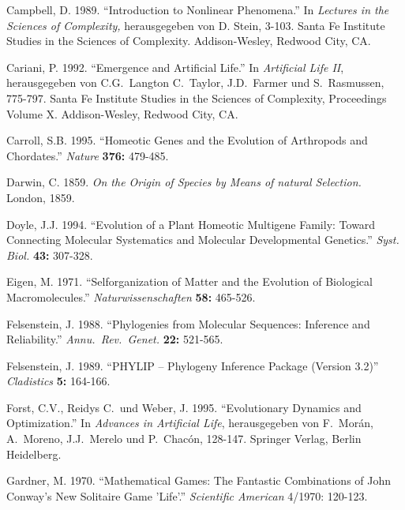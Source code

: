 \begin{thebibliography}{99}
Campbell, D. 1989. "`Introduction to Nonlinear Phenomena."' In \textsl{Lectures in the Sciences of Complexity,}
herausgegeben von D. Stein, 3-103. Santa Fe
Institute Studies in the Sciences of Complexity. Addison-Wesley, Redwood City, CA.

Cariani, P. 1992. "`Emergence and Artificial Life."'
In \textsl{Artificial Life II}, herausgegeben von C.G.\ Langton 
C.\ Taylor, J.D.\ Farmer und S.\ Rasmussen, 775-797. Santa Fe
Institute Studies in the Sciences of Complexity, Proceedings Volume X.
Addison-Wesley, Redwood City, CA.

Carroll, S.B. 1995. "`Homeotic Genes and the Evolution of Arthropods and Chordates."'
\textsl{Nature} \textbf{376:} 479-485.


Darwin, C. 1859. \textsl{On the Origin of Species by Means of natural Selection.} London, 1859.

Doyle, J.J. 1994. "`Evolution of a Plant Homeotic Multigene Family: Toward Connecting Molecular Systematics
and Molecular Developmental Genetics."' \textsl{Syst. Biol.} \textbf{43:} 307-328.

Eigen, M. 1971. "`Selforganization of Matter and the Evolution of Biological
Macromolecules."' \textsl{Naturwissenschaften} \textbf{58:} 465-526.

Felsenstein, J. 1988. "`Phylogenies from Molecular Sequences: Inference and Reliability."'
\textsl{Annu.\ Rev.\ Genet.} \textbf{22:} 521-565.

Felsenstein, J. 1989. "`PHYLIP -- Phylogeny Inference Package (Version 3.2)"'
\textsl{Cladistics} \textbf{5:} 164-166.

Forst, C.V., Reidys C.\ und Weber, J. 1995. "`Evolutionary Dynamics and Optimization."'
In \textsl{Advances in Artificial Life}, herausgegeben von F.\ Mor{\'a}n, A.\ Moreno,
J.J.\ Merelo und P.\ Chac{\'o}n, 128-147. Springer Verlag, Berlin Heidelberg.

Gardner, M. 1970. "`Mathematical Games: The Fantastic Combinations of John Conway's New
Solitaire Game 'Life'."' \textsl{Scientific American} 4/1970: 120-123.



\end{thebibliography}
